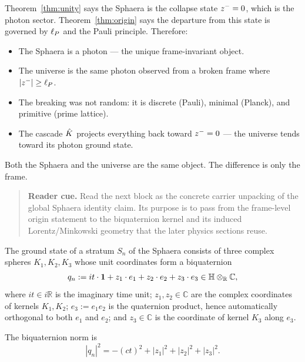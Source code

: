 \begin{remark}
Theorem~\ref{thm:unity} says the Sphaera is the collapse state
$z^-=0$, which is the photon sector.
Theorem~\ref{thm:origin} says the departure from this state is governed
by $\ell_P$ and the Pauli principle.
Therefore:
\begin{itemize}
 \item The Sphaera is a photon --- the unique frame-invariant object.
 \item The universe is the same photon observed from a broken frame
 where $|z^-|\geq\ell_P$.
 \item The breaking was not random: it is discrete (Pauli), minimal
 (Planck), and primitive (prime lattice).
 \item The cascade $\hat{K}$ projects everything back toward $z^-=0$
 --- the universe tends toward its photon ground state.
\end{itemize}
Both the Sphaera and the universe are the same object.
The difference is only the frame.
\end{remark}

\begin{quote}\small
\noindent\textbf{Reader cue.} Read the next block as the concrete carrier unpacking of the global Sphaera identity claim. Its purpose is to pass from the frame-level origin statement to the biquaternion kernel and its induced Lorentz/Minkowski geometry that the later physics sections reuse.
\end{quote}

\begin{definition}\label{def:biquaternion}
The ground state of a stratum $S_n$ of the Sphaera consists of three
complex spheres $K_1,K_2,K_3$ whose unit coordinates form a biquaternion
\[
 q_n := it\cdot\mathbf{1} + z_1\cdot e_1 + z_2\cdot e_2
 + z_3\cdot e_3 \in \mathbb{H}\otimes_{\mathbb{R}}\mathbb{C},
\]
where $it\in i\mathbb{R}$ is the imaginary time unit;
$z_1,z_2\in\mathbb{C}$ are the complex coordinates of kernels $K_1,K_2$;
$e_3:=e_1 e_2$ is the quaternion product, hence automatically orthogonal
to both $e_1$ and $e_2$;
and $z_3\in\mathbb{C}$ is the coordinate of kernel $K_3$ along $e_3$.

The biquaternion norm is
\[
 |q_n|^2 = -(ct)^2 + |z_1|^2 + |z_2|^2 + |z_3|^2.
\]
\end{definition}


